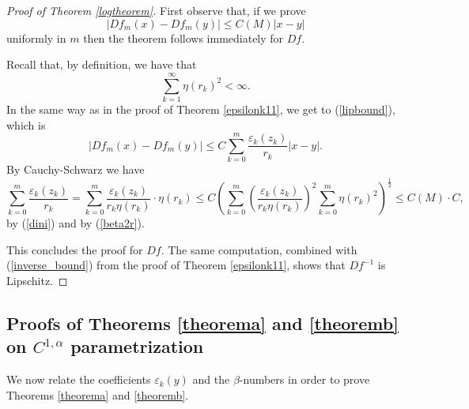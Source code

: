 \documentclass[11pt, twoside, leqno]{article}
\numberwithin{equation}{section}
\theoremstyle{plain}
\theoremstyle{definition}
\renewcommand{\emptyset}{\varnothing} %
\newcommand{\e}{\varepsilon} %
\newcommand{\dist}{\operatorname{dist}}
\begin{document}
\begin{proof} [Proof of Theorem \ref{logtheorem}]
First observe that, if we prove 
\begin{equation}
\left| Df_m(x)-Df_m(y)\right| \leq C(M) |x-y|
\end{equation}
uniformly in $m$ then the theorem follows immediately for $Df$.

Recall that, by definition, we have that
\begin{equation} \label{dini}
\sum_{k=1}^{\infty}\eta(r_k)^2 < \infty.
\end{equation}
In the same way as in the proof of Theorem \ref{epsilonk11}, we get to (\ref{lipbound}), which is
\begin{equation}
\left| Df_m(x)-Df_m(y)\right| \leq C \sum_{k=0}^m \frac{\e_k(z_k)}{r_k} |x-y|.
\end{equation}
By Cauchy-Schwarz we have
\begin{equation}
\sum_{k=0}^m \frac{\e_k(z_k)}{r_k} = \sum_{k=0}^m \frac{\e_k(z_k)}{r_k\eta(r_k)}\cdot \eta(r_k) \leq C \left( \sum_{k=0}^m \left(\frac{\e_k(z_k)}{r_k\eta(r_k)}\right)^2\sum_{k=0}^m\eta(r_k)^2\right)^\frac12 \leq C(M) \cdot C,
\end{equation}
by (\ref{dini}) and by (\ref{beta2r}).

This concludes the proof for $Df$. The same computation, combined with (\ref{inverse_bound}) from the proof of Theorem \ref{epsilonk11}, shows that $Df^{-1}$ is Lipschitz.
\end{proof}



\subsection{Proofs of Theorems \ref{theorema} and \ref{theoremb} on \texorpdfstring{$C^{1,\alpha}$}{C1alpha} parametrization} \label{improv}

We now relate the coefficients $\e_k(y)$ and the $\beta$-numbers in order to prove Theorems \ref{theorema} and \ref{theoremb}.


\end{document}
